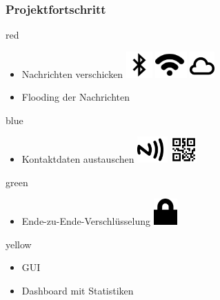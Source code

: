 \documentclass[accentcolor=tud2d,colorbacktitle]{tudbeamer}
\begin{document}
  \begin{frame}
    \frametitle{Projektfortschritt}
    \begin{multicols}{2}
    \begin{mybox}{red}
        \begin{itemize}
          \item Nachrichten verschicken
            \includegraphics[height=1cm]{bluetooth.png}
            \includegraphics[height=1cm]{wifi.png}
            \includegraphics[height=1cm]{cloud.png}
          \item Flooding der Nachrichten
        \end{itemize}
      \end{mybox}
      \begin{mybox}{blue}
        \begin{itemize}
          \item Kontaktdaten austauschen
            \includegraphics[height=1cm]{nfc.png}
            \includegraphics[height=1cm]{qrcode.png}
        \end{itemize}
      \end{mybox}
      \begin{mybox}{green}
        \begin{itemize}
          \item Ende-zu-Ende-Verschlüsselung
            \includegraphics[height=1cm]{lock.png}
        \end{itemize}
      \end{mybox}
      \begin{mybox}{yellow}
        \begin{itemize}
          \item GUI
          \item Dashboard mit Statistiken
        \end{itemize}
      \end{mybox}
    \end{multicols}
  \end{frame}
\end{document}

